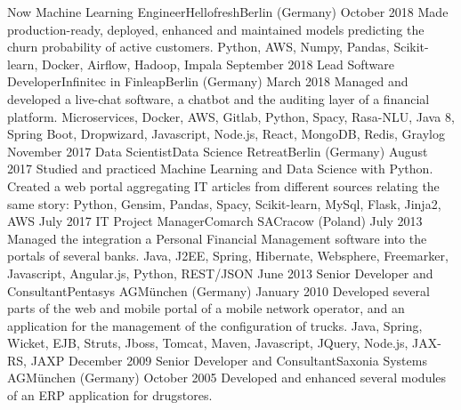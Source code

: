 %
%
%
\begin{experiences}
 \experience
    {Now}       {Machine Learning Engineer}{Hellofresh}{Berlin (Germany)}
    {October 2018}  {Made production-ready, deployed, enhanced and maintained models predicting the churn probability of active customers.}
                    {Python, AWS, Numpy, Pandas, Scikit-learn, Docker, Airflow, Hadoop, Impala}
  \emptySeparator
  \experience
    {September 2018}       {Lead Software Developer}{Infinitec in Finleap}{Berlin (Germany)}
    {March 2018}  {Managed and developed a live-chat software, a chatbot and the auditing layer of a financial platform.}
                    {Microservices, Docker, AWS, Gitlab, Python, Spacy, Rasa-NLU, Java 8, Spring Boot, Dropwizard, Javascript, Node.js, React, MongoDB, Redis, Graylog}
  \emptySeparator
  \experience
    {November 2017}   {Data Scientist}{Data Science Retreat}{Berlin (Germany)}
    {August 2017}  {Studied and practiced Machine Learning and Data Science with Python. Created a web portal aggregating IT articles from different sources relating the same story: 
			}
                    {Python, Gensim, Pandas, Spacy, Scikit-learn, MySql, Flask, Jinja2, AWS}
  \emptySeparator
  \experience
    {July 2017} {IT Project Manager}{Comarch SA}{Cracow (Poland)}
    {July 2013} {Managed the integration a Personal Financial Management software into the portals of several banks.}
                    {Java, J2EE, Spring, Hibernate, Websphere, Freemarker, Javascript, Angular.js, Python, REST/JSON}
  \emptySeparator
  \experience
    {June 2013}    {Senior Developer and Consultant}{Pentasys AG}{München (Germany)}
    {January 2010} {Developed several parts of the web and mobile portal of a mobile network operator, and an application for the management of the configuration of trucks.}
                    {Java, Spring, Wicket, EJB, Struts, Jboss, Tomcat, Maven, Javascript, JQuery, Node.js, JAX-RS, JAXP}
  \emptySeparator
  \experience
  {December 2009}   {Senior Developer and Consultant}{Saxonia Systems AG}{München (Germany)}
  {October 2005}    {
  					    Developed and enhanced several modules of an ERP application for drugstores.
  					}   

\end{experiences}

